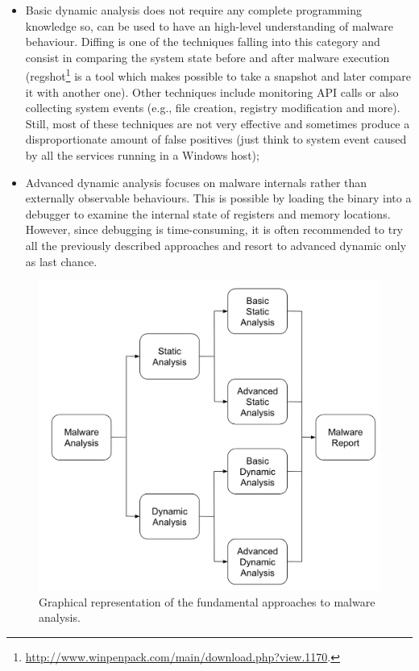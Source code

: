\documentclass[LaM,binding=0.6cm]{sapthesis}
\begin{document}
\begin{itemize}
\begin{itemize}
\item Basic dynamic analysis does not require any complete programming knowledge so, can be used to have an high-level understanding of malware behaviour. Diffing is one of the techniques falling into this category and consist in comparing the system state before and after malware execution (regshot\footnote{\url{http://www.winpenpack.com/main/download.php?view.1170}.} is a tool which makes possible to take a snapshot and later compare it with another one). Other techniques include monitoring API calls or also collecting system events (e.g., file creation, registry modification and more). Still, most of these techniques are not very effective and sometimes produce a disproportionate amount of false positives (just think to system event caused by all the services running in a Windows host);
\item Advanced dynamic analysis focuses on malware internals rather than externally observable behaviours. This is possible by loading the binary into a debugger to examine the internal state of registers and memory locations. However, since debugging is time-consuming, it is often recommended to try all the previously described approaches and resort to advanced dynamic only as last chance.
\end{itemize}
\end{itemize}

\begin{figure}[h!]
\centering
\includegraphics[scale=.5]{images/background3}
\caption{Graphical representation of the fundamental approaches to malware analysis.}
\end{figure}
\end{document}

